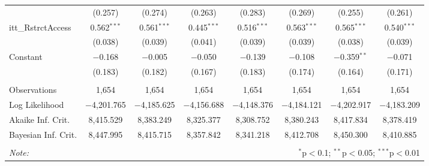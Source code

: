 \begin{sidewaystable}[!htbp]
\begin{tabular}{@{\extracolsep{5pt}}lccccccc}
  & (0.257) & (0.274) & (0.263) & (0.283) & (0.269) & (0.255) & (0.261) \\ 
  itt\_RstrctAccess & 0.562$^{***}$ & 0.561$^{***}$ & 0.445$^{***}$ & 0.516$^{***}$ & 0.563$^{***}$ & 0.565$^{***}$ & 0.540$^{***}$ \\ 
  & (0.038) & (0.039) & (0.041) & (0.039) & (0.039) & (0.038) & (0.039) \\ 
  Constant & $-$0.168 & $-$0.005 & $-$0.050 & $-$0.139 & $-$0.108 & $-$0.359$^{**}$ & $-$0.071 \\ 
  & (0.183) & (0.182) & (0.167) & (0.183) & (0.174) & (0.164) & (0.171) \\ 
 \hline \\[-1.8ex] 
Observations & 1,654 & 1,654 & 1,654 & 1,654 & 1,654 & 1,654 & 1,654 \\ 
Log Likelihood & $-$4,201.765 & $-$4,185.625 & $-$4,156.688 & $-$4,148.376 & $-$4,184.121 & $-$4,202.917 & $-$4,183.209 \\ 
Akaike Inf. Crit. & 8,415.529 & 8,383.249 & 8,325.377 & 8,308.752 & 8,380.243 & 8,417.834 & 8,378.419 \\ 
Bayesian Inf. Crit. & 8,447.995 & 8,415.715 & 8,357.842 & 8,341.218 & 8,412.708 & 8,450.300 & 8,410.885 \\ 
\hline 
\hline \\[-1.8ex] 
\textit{Note:}  & \multicolumn{7}{r}{$^{*}$p$<$0.1; $^{**}$p$<$0.05; $^{***}$p$<$0.01} \\ 
\end{tabular} 
\end{sidewaystable} 
